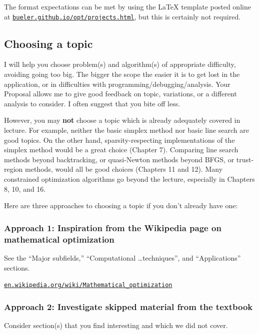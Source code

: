 \documentclass[12pt]{amsart}
\begin{document}
The format expectations can be met by using the \LaTeX\xspace template posted online at \href{https://bueler.github.io/opt/projects.html}{\texttt{bueler.github.io/opt/projects.html}}, but this is certainly not required.


\subsection*{Choosing a topic}  I will help you choose problem(s) and algorithm(s) of appropriate difficulty, avoiding going too big.  The bigger the scope the easier it is to get lost in the application, or in difficulties with programming/debugging/analysis.  Your Proposal allows me to give good feedback on topic, variations, or a different analysis to consider.  I often suggest that you bite off less.

However, you may \textbf{not} choose a topic which is already adequately covered in lecture.  For example, neither the basic simplex method nor basic line search are good topics.  On the other hand, sparsity-respecting implementations of the simplex method would be a great choice (Chapter 7).  Comparing line search methods beyond backtracking, or quasi-Newton methods beyond BFGS, or trust-region methods, would all be good choices (Chapters 11 and 12).  Many constrained optimization algorithms go beyond the lecture, especially in Chapters 8, 10, and 16. 

Here are three approaches to choosing a topic if you don't already have one:

\subsubsection*{Approach 1: Inspiration from the Wikipedia page on mathematical optimization}

See the ``Major subfields,'' ``Computational \dots techniques'', and ``Applications'' sections.

   \centerline{\href{https://en.wikipedia.org/wiki/Mathematical_optimization}{\texttt{en.wikipedia.org/wiki/Mathematical\_optimization}}}

\subsubsection*{Approach 2: Investigate skipped material from the textbook}  Consider section(s) that you find interesting and which we did not cover.
\end{document}

